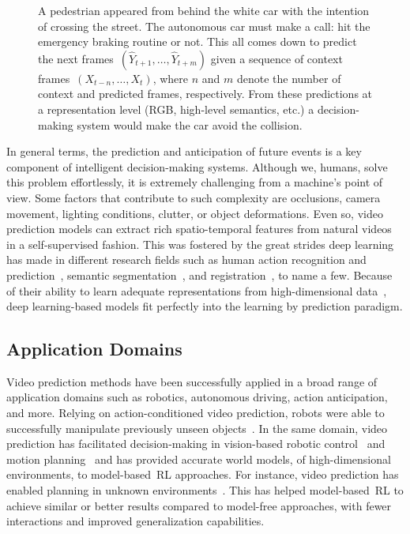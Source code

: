\begin{figure}[!hbt]
	\centering
	\resizebox{0.75\textwidth}{!}{
		}
	\caption{A pedestrian appeared from behind the white car with the intention of crossing the street. The autonomous car must make a call: hit the emergency braking routine or not. This all comes down to predict the next frames~$(\hat{Y}_{t+1},\ldots,\hat{Y}_{t+m})$ given a sequence of context frames~$(X_{t-n}, \ldots, X_{t})$, where $n$ and $m$ denote the number of context and predicted frames, respectively. From these predictions at a representation level (\acs{RGB}, high-level semantics, etc.) a decision-making system would make the car avoid the collision.}
	\label{fig:pedestrian}
\end{figure}

In general terms, the prediction and anticipation of future events is a key component of intelligent decision-making systems. Although we, humans, solve this problem effortlessly,
it is extremely challenging from a machine's point of view.
Some factors that contribute to such complexity are occlusions, camera movement, lighting conditions, clutter, or object deformations. Even so, video prediction models can extract rich spatio-temporal features from natural videos in a self-supervised fashion. This was fostered by the great strides deep learning has made in different research fields such as human action recognition and prediction~\cite{Kong2018}, semantic segmentation~\cite{Garcia2018a}, and registration~\cite{Villena2020}, to name a few. Because of their ability to learn adequate representations from high-dimensional data~\cite{LeCun2015}, deep learning-based models fit perfectly into the learning by prediction paradigm.

\subsection{Application Domains}
Video prediction methods have been successfully applied in a broad range of application domains such as robotics, autonomous driving, action anticipation, and more. Relying on action-conditioned video prediction, robots were able to successfully manipulate previously unseen objects~\cite{Finn2016}. In the same domain, video prediction has facilitated decision-making in vision-based robotic control~\cite{Ebert2018} and motion planning~\cite{Koppula2016,Xie2019} and has provided accurate world models, of high-dimensional environments, to model-based~\ac{RL} approaches. For instance, video prediction has enabled planning in unknown environments~\cite{Hafner2019,Kaiser2020}. This has helped model-based~\ac{RL} to achieve similar or better results compared to model-free approaches, with fewer interactions and improved generalization capabilities.

